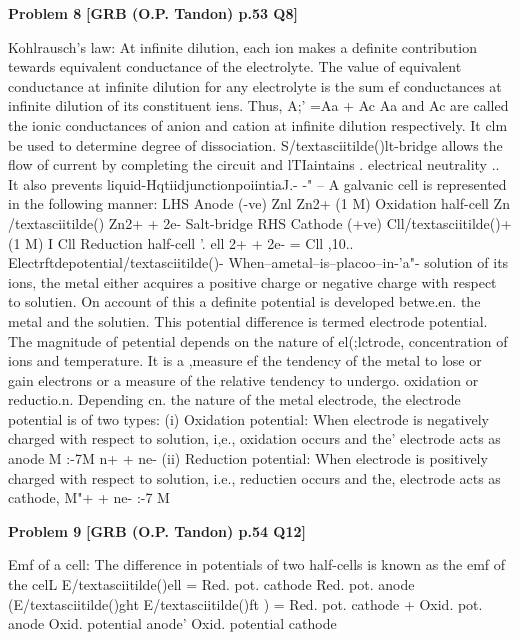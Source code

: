 \begin{problembox}
\textbf{Problem 8} \hfill \textbf{[GRB (O.P. Tandon) p.53 Q8]}
\label{q:ext-grb_all_questions-8}

Kohlrausch's law: At infinite dilution, each ion makes 
a definite contribution tewards equivalent conductance of the 
electrolyte. The value of equivalent conductance at infinite 
dilution for any electrolyte is the sum ef conductances at infinite 
dilution of its constituent iens. Thus, 
A;' =Aa + Ac 
Aa and Ac are called the ionic conductances of anion and 
cation at infinite dilution respectively. It clm be used to determine 
degree of dissociation. 
S/textasciitilde()lt-bridge allows the flow of current by completing the 
circuit and lTIaintains . electrical neutrality .. It also prevents 
liquid-HqtiidjunctionpoiintiaJ.-
-" --
A galvanic cell is represented in the following manner: 
LHS 
Anode (-ve) 
Znl Zn2+ (1 M) 
Oxidation half-cell 
Zn /textasciitilde() Zn2+ + 2e-
Salt-bridge 
RHS 
Cathode (+ve) 
Cll/textasciitilde()+ (1 M) I Cll 
Reduction half-cell 
'. ell 2+ + 2e- = Cll 
,10.. Electrftdepotential/textasciitilde()- When--ametal--is--placoo--in-'a"-
solution of its ions, the metal either acquires a positive charge or 
negative charge with respect to solutien. On account of this a 
definite potential is developed betwe.en. the metal and the 
solutien. This potential difference is termed electrode potential. 
The magnitude of petential depends on the nature of el(;lctrode, 
concentration of ions and temperature. It is a ,measure ef the 
tendency of the metal to lose or gain electrons or a measure of the 
relative tendency to undergo. oxidation or reductio.n. Depending 
cn. the nature of the metal electrode, the electrode potential is of 
two types: 
(i) Oxidation potential: When electrode is negatively 
charged with respect to solution, i,e., oxidation occurs and the' 
electrode acts as anode 
M :-7M n+ + ne-
(ii) Reduction potential: When electrode is positively 
charged with respect to solution, i.e., reductien occurs and the, 
electrode acts as cathode, 
M"+ + ne- :-7 M
\end{problembox}

\begin{problembox}
\textbf{Problem 9} \hfill \textbf{[GRB (O.P. Tandon) p.54 Q12]}
\label{q:ext-grb_all_questions-9}

Emf of a cell: The difference in potentials of two 
half-cells is known as the emf of the celL 
E/textasciitilde()ell = Red. pot. cathode Red. pot. anode (E/textasciitilde()ght 
E/textasciitilde()ft ) 
= Red. pot. cathode + Oxid. pot. anode 
Oxid. potential anode' Oxid. potential cathode
\end{problembox}

